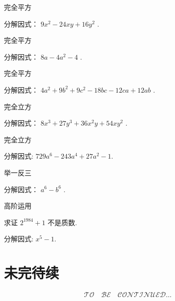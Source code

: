 \documentclass[aspectratio=169]{ctexbeamer}
\theoremstyle{definition}
\begin{document}
\begin{frame}[t]{完全平方}
	\begin{example}
		分解因式： $9 x^{2}-24 x y+16 y^{2}$ .
	\end{example}
\end{frame}

\begin{frame}[t]{完全平方}
	\begin{example}
		分解因式： $8 a-4 a^{2}-4$ .
	\end{example}
\end{frame}

\begin{frame}[t]{完全平方}
	\begin{example}\label{ex:应用公式-例8}
		分解因式： $4 a^{2}+9 b^{2}+9 c^{2}-18 b c-12 c a+12 a b$ .
	\end{example}
\end{frame}

\begin{frame}[t]{完全立方}
	\begin{example}
		分解因式： $8 x^{3}+27 y^{3}+36 x^{2} y+54 x y^{2}$ .
	\end{example}
\end{frame}

\begin{frame}[t]{完全立方}
	\begin{example}
		分解因式: $729 a^{6}-243 a^{4}+27 a^{2}-1$.
	\end{example}
\end{frame}

\begin{frame}[t]{举一反三}
	\begin{example}
		分解因式： $a^{6}-b^{6}$ .
	\end{example}
\end{frame}

\begin{frame}[t]{高阶运用}
	\begin{example}
		求证 $2^{1984}+1$ 不是质数.
	\end{example}
\end{frame}

\begin{frame}[t]
	\begin{example}
		分解因式: $x^{5}-1$.
	\end{example}
\end{frame}

\section*{未完待续}
\begin{frame}
	\Huge
	$$
		\mathcal{TO}	\quad
		\mathcal{BE}  	\quad
		\mathcal{CONTINUED}
		\ldots
	$$
\end{frame}
\end{document}
